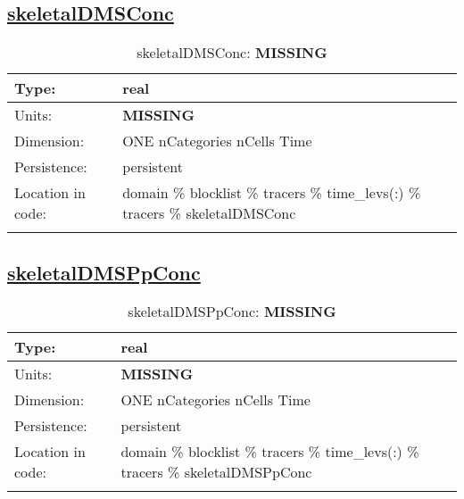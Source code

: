 \subsection[skeletalDMSConc]{\hyperref[sec:var_tab_tracers]{skeletalDMSConc}}
\label{subsec:var_sec_tracers_skeletalDMSConc}
\begin{center}
\begin{longtable}{| p{2.0in} | p{4.0in} |}
        \hline 
        Type: & real \\
        \hline 
        Units: & {\bf \color{red} MISSING} \\
        \hline 
        Dimension: & ONE nCategories nCells Time \\
        \hline 
        Persistence: & persistent \\
        \hline 
         Location in code: & domain \% blocklist \% tracers \% time\_levs(:) \% tracers \% skeletalDMSConc \\
         \hline 
    \caption{skeletalDMSConc: {\bf \color{red} MISSING}}
\end{longtable}
\end{center}
\subsection[skeletalDMSPpConc]{\hyperref[sec:var_tab_tracers]{skeletalDMSPpConc}}
\label{subsec:var_sec_tracers_skeletalDMSPpConc}
\begin{center}
\begin{longtable}{| p{2.0in} | p{4.0in} |}
        \hline 
        Type: & real \\
        \hline 
        Units: & {\bf \color{red} MISSING} \\
        \hline 
        Dimension: & ONE nCategories nCells Time \\
        \hline 
        Persistence: & persistent \\
        \hline 
         Location in code: & domain \% blocklist \% tracers \% time\_levs(:) \% tracers \% skeletalDMSPpConc \\
         \hline 
    \caption{skeletalDMSPpConc: {\bf \color{red} MISSING}}
\end{longtable}
\end{center}
